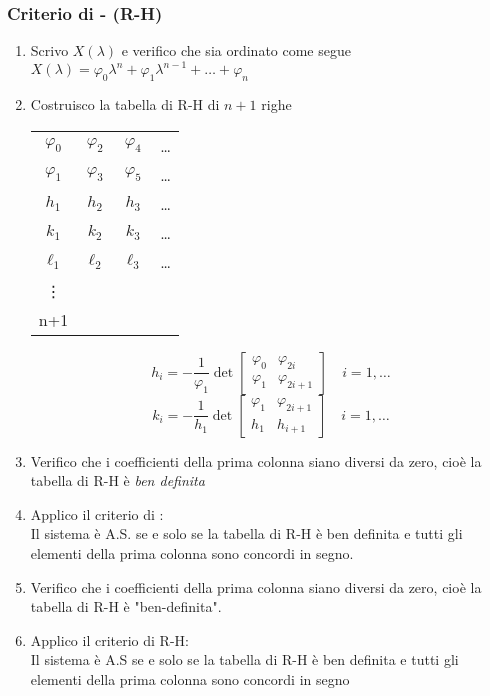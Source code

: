 	\subsubsection{Criterio di - (R-H)}
	\begin{enumerate}
		\item Scrivo $ X(\lambda) $ e verifico che sia ordinato come segue\\
		$ X(\lambda) = \varphi_0\lambda^n + \varphi_1\lambda^{n-1} + \dots + \varphi_n $
		\item Costruisco la tabella di R-H di $ n+1 $ righe\\
		\begin{table}[H]
			\centering
			\begin{tabular}{c c c c}
				$\varphi_0$ & $\varphi_2$ & $\varphi_4$ & \dots \\
				$\varphi_1$ & $\varphi_3$ & $\varphi_5$ & \dots \\
				$ h_1 $   & $ h_2 $     & $ h_3 $     & \dots \\
				$ k_1 $   & $ k_2 $     & $ k_3 $     & \dots \\
				$ \ell_1 $  & $ \ell_2 $  & $ \ell_3 $  & \dots \\
				\vdots    &             &             &       \\
				n+1   &             &             &
			\end{tabular}
		\end{table}
		\[ h_i = -\frac{1}{\varphi_1} \det\left[\begin{matrix}
			\varphi_0 & \varphi_{2i}\\
			\varphi_1 & \varphi_{2i +1}
		\end{matrix}\right]  \quad i = 1,\dots\]
		\[ k_i = -\frac{1}{h_1} \det\left[\begin{matrix}
			\varphi_1 & \varphi_{2i+1}\\
			h_1 & h_{i +1}
		\end{matrix}\right]  \quad i = 1,\dots\]
		\item Verifico che i coefficienti della prima colonna siano diversi da zero, cioè la tabella di R-H è \emph{ben definita}
		\item Applico il criterio di :\\
		Il sistema è A.S. se e solo se la tabella di R-H è ben definita e tutti gli elementi della prima colonna sono concordi in segno.
		\item Verifico che i coefficienti della prima colonna siano diversi da zero, cioè la tabella di R-H è "ben-definita".
		\item Applico il criterio di R-H:\\
		Il sistema è A.S se e solo se la tabella di R-H è ben definita e tutti gli elementi della prima colonna sono concordi in segno
	\end{enumerate}
